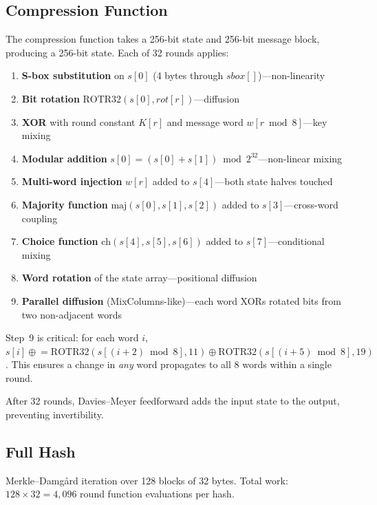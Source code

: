 \documentclass[preprint]{iacrtrans}
\begin{document}
\subsection{Compression Function}

The compression function takes a 256-bit state and 256-bit message block, producing a 256-bit state. Each of 32 rounds applies:

\begin{enumerate}
    \item \textbf{S-box substitution} on $s[0]$ (4 bytes through $\mathit{sbox}[]$)---non-linearity
    \item \textbf{Bit rotation} $\text{ROTR32}(s[0], \mathit{rot}[r])$---diffusion
    \item \textbf{XOR} with round constant $K[r]$ and message word $w[r \bmod 8]$---key mixing
    \item \textbf{Modular addition} $s[0] = (s[0] + s[1]) \bmod 2^{32}$---non-linear mixing
    \item \textbf{Multi-word injection} $w[r]$ added to $s[4]$---both state halves touched
    \item \textbf{Majority function} $\text{maj}(s[0], s[1], s[2])$ added to $s[3]$---cross-word coupling
    \item \textbf{Choice function} $\text{ch}(s[4], s[5], s[6])$ added to $s[7]$---conditional mixing
    \item \textbf{Word rotation} of the state array---positional diffusion
    \item \textbf{Parallel diffusion} (MixColumns-like)---each word XORs rotated bits from two non-adjacent words
\end{enumerate}

Step~9 is critical: for each word $i$, $s[i] \mathrel{\oplus}= \text{ROTR32}(s[(i{+}2) \bmod 8], 11) \oplus \text{ROTR32}(s[(i{+}5) \bmod 8], 19)$. This ensures a change in \emph{any} word propagates to all 8 words within a single round.

After 32 rounds, Davies--Meyer feedforward adds the input state to the output, preventing invertibility.

\subsection{Full Hash}

Merkle--Damg{\aa}rd iteration over 128 blocks of 32 bytes. Total work: $128 \times 32 = 4{,}096$ round function evaluations per hash.
\end{document}
